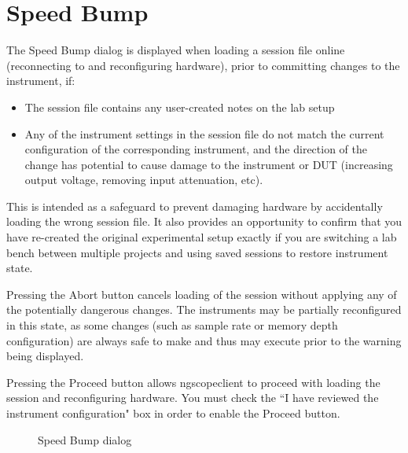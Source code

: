 
\section{Speed Bump}
\label{dlg:speedbump}

The Speed Bump dialog is displayed when loading a session file online (reconnecting to and reconfiguring hardware),
prior to committing changes to the instrument, if:

\begin{itemize}
\item The session file contains any user-created notes on the lab setup
\item Any of the instrument settings in the session file do not match the current configuration of the corresponding
instrument, and the direction of the change has potential to cause damage to the instrument or DUT (increasing output
voltage, removing input attenuation, etc).
\end{itemize}

This is intended as a safeguard to prevent damaging hardware by accidentally loading the wrong session file. It also
provides an opportunity to confirm that you have re-created the original experimental setup exactly if you are
switching a lab bench between multiple projects and using saved sessions to restore instrument state.

Pressing the Abort button cancels loading of the session without applying any of the potentially dangerous changes.
The instruments may be partially reconfigured in this state, as some changes (such as sample rate or memory depth
configuration) are always safe to make and thus may execute prior to the warning being displayed.

Pressing the Proceed button allows ngscopeclient to proceed with loading the session and reconfiguring hardware. You
must check the ``I have reviewed the instrument configuration" box in order to enable the Proceed button.

\begin{figure}[H]
\centering
{}
\caption{Speed Bump dialog}
\label{speedbump}
\end{figure}


